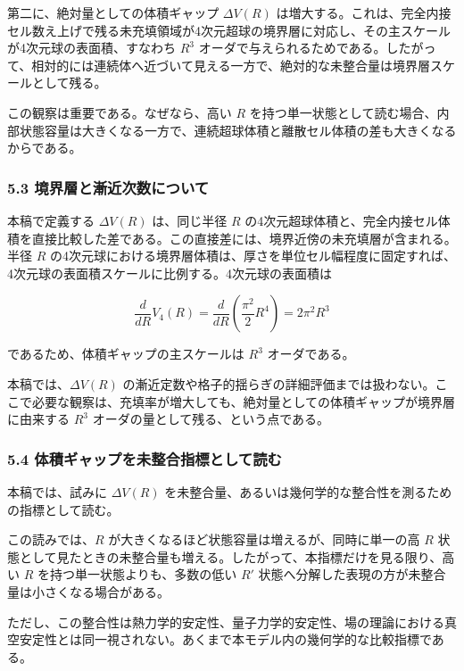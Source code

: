 \documentclass[
]{ltjsarticle}
\begin{document}
第二に、絶対量としての体積ギャップ \(\Delta V(R)\)
は増大する。これは、完全内接セル数え上げで残る未充填領域が4次元超球の境界層に対応し、その主スケールが4次元球の表面積、すなわち
\(R^3\)
オーダで与えられるためである。したがって、相対的には連続体へ近づいて見える一方で、絶対的な未整合量は境界層スケールとして残る。

この観察は重要である。なぜなら、高い \(R\)
を持つ単一状態として読む場合、内部状態容量は大きくなる一方で、連続超球体積と離散セル体積の差も大きくなるからである。

\subsubsection{5.3
境界層と漸近次数について}\label{ux5883ux754cux5c64ux3068ux6f38ux8fd1ux6b21ux6570ux306bux3064ux3044ux3066}

本稿で定義する \(\Delta V(R)\) は、同じ半径 \(R\)
の4次元超球体積と、完全内接セル体積を直接比較した差である。この直接差には、境界近傍の未充填層が含まれる。半径
\(R\)
の4次元球における境界層体積は、厚さを単位セル幅程度に固定すれば、4次元球の表面積スケールに比例する。4次元球の表面積は

\[
\frac{d}{dR}V_4(R)=\frac{d}{dR}\left(\frac{\pi^2}{2}R^4\right)=2\pi^2R^3
\]

であるため、体積ギャップの主スケールは \(R^3\) オーダである。

本稿では、\(\Delta V(R)\)
の漸近定数や格子的揺らぎの詳細評価までは扱わない。ここで必要な観察は、充填率が増大しても、絶対量としての体積ギャップが境界層に由来する
\(R^3\) オーダの量として残る、という点である。

\subsubsection{5.4
体積ギャップを未整合指標として読む}\label{ux4f53ux7a4dux30aeux30e3ux30c3ux30d7ux3092ux672aux6574ux5408ux6307ux6a19ux3068ux3057ux3066ux8aadux3080}

本稿では、試みに \(\Delta V(R)\)
を未整合量、あるいは幾何学的な整合性を測るための指標として読む。

この読みでは、\(R\) が大きくなるほど状態容量は増えるが、同時に単一の高
\(R\)
状態として見たときの未整合量も増える。したがって、本指標だけを見る限り、高い
\(R\) を持つ単一状態よりも、多数の低い \(R'\)
状態へ分解した表現の方が未整合量は小さくなる場合がある。

ただし、この整合性は熱力学的安定性、量子力学的安定性、場の理論における真空安定性とは同一視されない。あくまで本モデル内の幾何学的な比較指標である。
\end{document}

